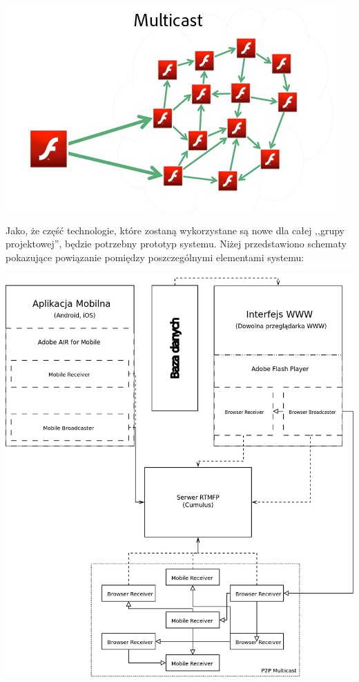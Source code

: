 \begin{center}
    \includegraphics[width=\textwidth]{img/adobe-p2p-multicast.jpg}
\end{center}

\newpage
Jako, że część technologie, które zostaną wykorzystane są nowe dla całej ,,grupy projektowej'', będzie potrzebny prototyp systemu. Niżej przedstawiono schematy pokazujące powiązanie pomiędzy poszczególnymi elementami systemu:

\begin{center}
    \includegraphics[width=\textwidth]{diagramy/architektura.png}
\end{center}

